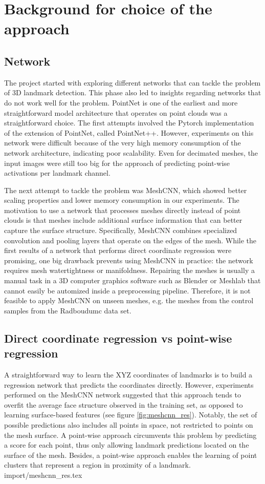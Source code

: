 \documentclass[class=article, crop=false]{standalone}
\begin{document}
\section{Background for choice of the approach}
\label{sec:app_approach_choice}
\subsection{Network}
The project started with exploring different networks that can tackle the problem of 3D landmark detection. This phase also led to insights regarding networks that do not work well for the problem. PointNet is one of the earliest and more straightforward model architecture that operates on point clouds was a straightforward choice. The first attempts involved the Pytorch implementation of the extension of PointNet, called PointNet++. However, experiments on this network were difficult because of the very high memory consumption of the network architecture, indicating poor scalability. Even for decimated meshes, the input images were still too big for the approach of predicting point-wise activations per landmark channel.

The next attempt to tackle the problem was MeshCNN, which showed better scaling properties and lower memory consumption in our experiments. The motivation to use a network that processes meshes directly instead of point clouds is that meshes include additional surface information that can better capture the surface structure. Specifically, MeshCNN combines specialized convolution and pooling layers that operate on the edges of the mesh. While the first results of a network that performs direct coordinate regression were promising, one big drawback prevents using MeshCNN in practice: the network requires mesh watertightness or manifoldness. Repairing the meshes is usually a manual task in a 3D computer graphics software such as Blender \cite{blender} or Meshlab \cite{meshlab} that cannot easily be automized inside a preprocessing pipeline. Therefore, it is not feasible to apply MeshCNN on unseen meshes, e.g. the meshes from the control samples from the Radboudumc data set.

\subsection{Direct coordinate regression vs point-wise regression}
\label{sec:coord_reg_vs_pw_reg}
A straightforward way to learn the XYZ coordinates of landmarks is to build a regression network that predicts the coordinates directly. However, experiments performed on the MeshCNN network suggested that this approach tends to overfit the average face structure observed in the training set, as opposed to learning surface-based features (see figure \ref{fig:meshcnn_res}). Notably, the set of possible predictions also includes all points in space, not restricted to points on the mesh surface. A point-wise approach circumvents this problem by predicting a score for each point, thus only allowing landmark predictions located on the surface of the mesh. Besides, a point-wise approach enables the learning of point clusters that represent a region in proximity of a landmark.
{import/meshcnn_res.tex}
\end{document}

